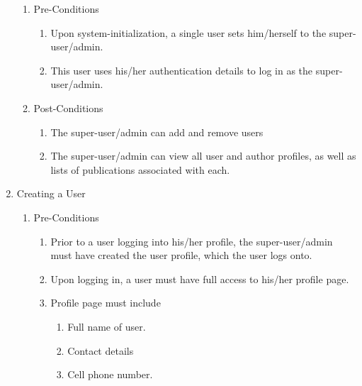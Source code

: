 \documentclass[hidelinks,a4paper,12pt]{article}
\begin{document}
\begin{enumerate}
		\begin{enumerate}
			\item  Pre-Conditions
			
			\begin{enumerate}
				\item  Upon system-initialization, a single user sets him/herself to the super-user/admin.
				
				\item  This user uses his/her authentication details to log in as the super-user/admin.
			\end{enumerate}
			
			\item  Post-Conditions
			
			\begin{enumerate}
				\item  The super-user/admin can add and remove users
				
				\item  The super-user/admin can view all user and author profiles, as well as lists of publications associated with each.
			\end{enumerate}
		\end{enumerate}
		
		\noindent  
		
		\item  Creating a User
		
		\begin{enumerate}
			\item  Pre-Conditions
			
			\begin{enumerate}
				\item  Prior to a user logging into his/her profile, the super-user/admin must have created the user profile, which the user logs onto.
				
				\item  Upon logging in, a user must have full access to his/her profile page.
				
				\item  Profile page must include
				
				\begin{enumerate}
					\item  Full name of user.
					
					\item  Contact details
					
					\item  Cell phone number.
					

\end{enumerate}
\end{enumerate}
\end{enumerate}
\end{enumerate}
\end{document}
